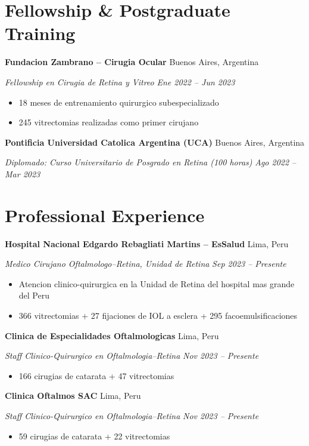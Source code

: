 \documentclass[11pt,letterpaper]{article}
\newcommand{\entry}[4]{%
  \noindent\textbf{#1} \hfill #2 \par\nopagebreak
  \textit{#3} \hfill \textit{#4} \par\nopagebreak
}
\begin{document}
\section{Fellowship \& Postgraduate Training}

\entry{Fundacion Zambrano -- Cirugia Ocular}{Buenos Aires, Argentina}{Fellowship en Cirugia de Retina y Vitreo}{Ene 2022 -- Jun 2023}
\begin{itemize}
  \item 18 meses de entrenamiento quirurgico subespecializado
  \item 245 vitrectomias realizadas como primer cirujano
\end{itemize}
\vspace{0.3em}

\entry{Pontificia Universidad Catolica Argentina (UCA)}{Buenos Aires, Argentina}{Diplomado: Curso Universitario de Posgrado en Retina (100 horas)}{Ago 2022 -- Mar 2023}
\vspace{0.3em}

\section{Professional Experience}

\entry{Hospital Nacional Edgardo Rebagliati Martins -- EsSalud}{Lima, Peru}{Medico Cirujano Oftalmologo--Retina, Unidad de Retina}{Sep 2023 -- Presente}
\begin{itemize}
  \item Atencion clinico-quirurgica en la Unidad de Retina del hospital mas grande del Peru
  \item 366 vitrectomias + 27 fijaciones de IOL a esclera + 295 facoemulsificaciones
\end{itemize}
\vspace{0.3em}

\entry{Clinica de Especialidades Oftalmologicas}{Lima, Peru}{Staff Clinico-Quirurgico en Oftalmologia--Retina}{Nov 2023 -- Presente}
\begin{itemize}
  \item 166 cirugias de catarata + 47 vitrectomias
\end{itemize}
\vspace{0.3em}

\entry{Clinica Oftalmos SAC}{Lima, Peru}{Staff Clinico-Quirurgico en Oftalmologia--Retina}{Nov 2023 -- Presente}
\begin{itemize}
  \item 59 cirugias de catarata + 22 vitrectomias
\end{itemize}
\vspace{0.3em}
\end{document}
